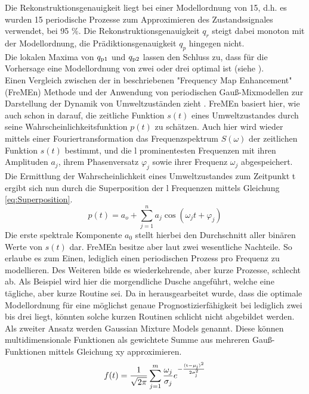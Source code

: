 Die Rekonstruktionsgenauigkeit liegt bei einer Modellordnung von 15, d.h. es wurden 15 periodische Prozesse zum Approximieren des Zustandssignales verwendet, bei 95 \%. Die Rekonstruktionsgenauigkeit $q_r$ steigt dabei monoton mit der Modellordnung, die Prädiktionsgenauigkeit $q_p$ hingegen nicht. %
\\
Die lokalen Maxima von $q_{\mathrm{p1}}$ und $q_{\mathrm{p2}}$ lassen den Schluss zu, dass für die Vorhersage eine Modellordnung von zwei oder drei optimal ist (siehe ). \\
Einen Vergleich zwischen der in \cite{Krajnik.2014} beschriebenen "Frequency Map Enhancement" (FreMEn) Methode und der Anwendung von periodischen Gauß-Mixmodellen zur Darstellung der Dynamik von Umweltzuständen zieht \cite{Krajnik.2015b}. FreMEn basiert hier, wie auch schon in \cite{Krajnik.2014} darauf, die zeitliche Funktion $s(t)$ eines Umweltzustandes durch seine Wahrscheinlichkeitsfunktion $p(t)$ zu schätzen. Auch hier wird wieder mittels einer Fouriertransformation das Frequenzspektrum $S(\omega)$ der zeitlichen Funktion $s(t)$ bestimmt, und die l prominentesten Frequenzen mit ihren Amplituden $a_j$, ihrem Phasenversatz $\varphi_j$ sowie ihrer Frequenz $\omega_j$ abgespeichert. Die Ermittlung der Wahrscheinlichkeit eines Umweltzustandes zum Zeitpunkt t ergibt sich nun durch die Superposition der l Frequenzen mittels Gleichung \ref{eq:Superposition}.
\begin{equation}
	p(t) = a_o + \sum_{j=1}^{n} a_j \cos(\omega_j t + \varphi_j)
	\label{eq:Superposition}
\end{equation}
Die erste spektrale Komponente $a_0$ stellt hierbei den Durchschnitt aller binären Werte von $s(t)$ dar. FreMEn besitze aber laut \cite{Krajnik.2015b} zwei wesentliche Nachteile. So erlaube es zum Einen, lediglich einen periodischen Prozess pro Frequenz zu modellieren. Des Weiteren bilde es wiederkehrende, aber kurze Prozesse, schlecht ab. Als Beispiel wird hier die morgendliche Dusche angeführt, welche eine tägliche, aber kurze Routine sei. Da in \cite{Krajnik.2014} herausgearbeitet wurde, dass die optimale Modellordnung für eine möglichst genaue Prognostizierfähigkeit bei lediglich zwei bis drei liegt, könnten solche kurzen Routinen schlicht nicht abgebildet werden. \\ Als zweiter Ansatz werden Gaussian Mixture Models genannt. Diese können multidimensionale Funktionen als gewichtete Summe aus mehreren Gauß-Funktionen mittels Gleichung xy approximieren.
\begin{equation}
	f(t) = \frac{1}{\sqrt{2 \pi}} \sum_{j=1}^{m} \frac{\omega_j}{\sigma_j} e^{\mathrm{- \frac{(t- \mu_j)^2}{2 \sigma_j ^2}}}
	\label{eq:Gaussian_Mixture_Models}
\end{equation}



